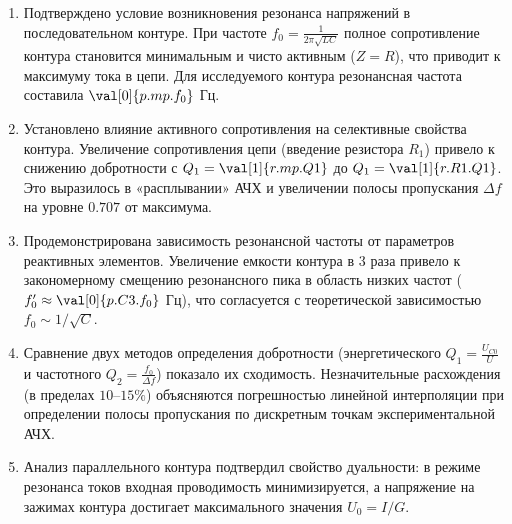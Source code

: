 \begin{enumerate}
    \item Подтверждено условие возникновения резонанса напряжений в последовательном контуре. При частоте $f_0 = \frac{1}{2\pi\sqrt{LC}}$ полное сопротивление контура становится минимальным и чисто активным ($Z = R$), что приводит к максимуму тока в цепи. Для исследуемого контура резонансная частота составила $\val[0]{p.mp.f_0}$ Гц.
    
    \item Установлено влияние активного сопротивления на селективные свойства контура. Увеличение сопротивления цепи (введение резистора $R_1$) привело к снижению добротности с $Q_1 = \val[1]{r.mp.Q1}$ до $Q_1 = \val[1]{r.R1.Q1}$. Это выразилось в «расплывании» АЧХ и увеличении полосы пропускания $\Delta f$ на уровне $0.707$ от максимума.
    
    \item Продемонстрирована зависимость резонансной частоты от параметров реактивных элементов. Увеличение емкости контура в 3 раза привело к закономерному смещению резонансного пика в область низких частот ($f_0' \approx \val[0]{p.C3.f_0}$ Гц), что согласуется с теоретической зависимостью $f_0 \sim 1/\sqrt{C}$.
    
    \item Сравнение двух методов определения добротности (энергетического $Q_1 = \frac{U_{C0}}{U}$ и частотного $Q_2 = \frac{f_0}{\Delta f}$) показало их сходимость. Незначительные расхождения (в пределах $10\text{--}15\%$) объясняются погрешностью линейной интерполяции при определении полосы пропускания по дискретным точкам экспериментальной АЧХ.
    
    \item Анализ параллельного контура подтвердил свойство дуальности: в режиме резонанса токов входная проводимость минимизируется, а напряжение на зажимах контура достигает максимального значения $U_0 = I/G$.
\end{enumerate}




























